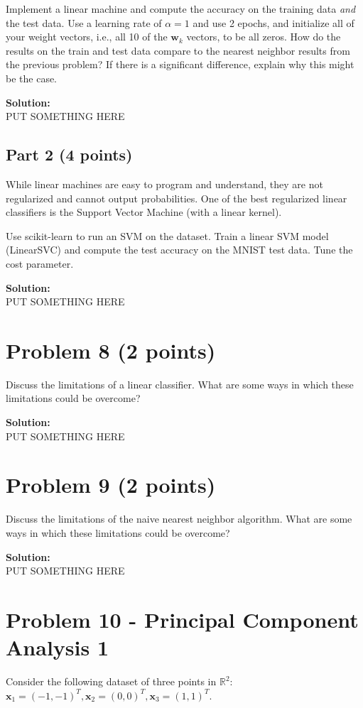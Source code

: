 \documentclass[11pt, oneside]{article}   	%
\begin{document}
Implement a linear machine and compute the accuracy on the training data \textit{and} the test data. Use a learning rate of $\alpha=1$ and use 2 epochs, and initialize all of your weight vectors, i.e., all 10 of the $\mathbf{w}_k$ vectors, to be all zeros. How do the results on the train and test data compare to the nearest neighbor results from the previous problem? If there is a significant difference, explain why this might be the case.

\textbf{Solution:}\\
PUT SOMETHING HERE 

\subsection*{Part 2 (4 points)}
While linear machines are easy to program and understand, they are not regularized and cannot output probabilities. One of the best regularized linear classifiers is the Support Vector Machine (with a linear kernel). 

Use scikit-learn to run an SVM on the dataset. Train a linear SVM model (LinearSVC) and compute the test accuracy on the MNIST test data. Tune the cost parameter.


\textbf{Solution:}\\
PUT SOMETHING HERE 

\section*{Problem 8 (2 points)}
Discuss the limitations of a linear classifier. What are some ways in which these limitations could be overcome?

\textbf{Solution:}\\
PUT SOMETHING HERE 

\section*{Problem 9 (2 points)}
Discuss the limitations of the naive nearest neighbor algorithm. What are some ways in which these limitations could be overcome?

\textbf{Solution:}\\
PUT SOMETHING HERE 

\section*{Problem 10 - Principal Component Analysis 1}
Consider the following dataset of three points in $\mathbb{R}^2$: ${\mathbf{x}}_1  = \left( { - 1, - 1} \right)^T ,{\mathbf{x}}_2  = \left( {0,0} \right)^T ,{\mathbf{x}}_3  = \left( {1,1} \right)^T$.
\end{document}

